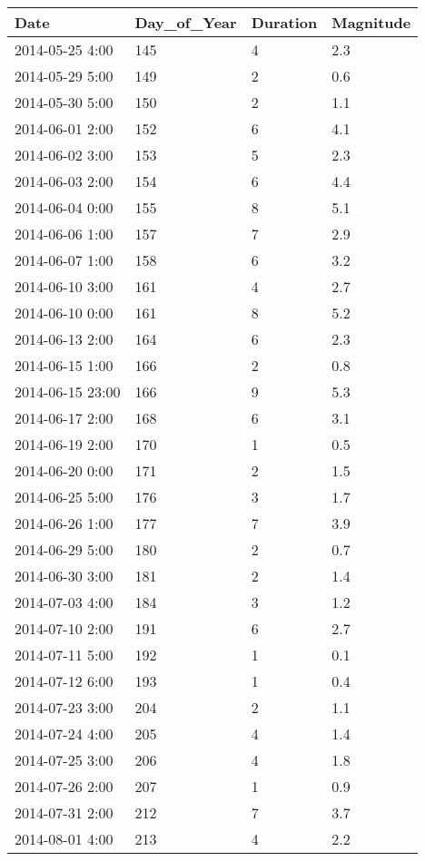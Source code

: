 \documentclass[
]{article}
\begin{document}
\begin{tabular}{l|l|l|l}
\hline
Date & Day\_of\_Year & Duration & Magnitude\\
\hline
2014-05-25 4:00 & 145 & 4 & 2.3\\
\hline
2014-05-29 5:00 & 149 & 2 & 0.6\\
\hline
2014-05-30 5:00 & 150 & 2 & 1.1\\
\hline
2014-06-01 2:00 & 152 & 6 & 4.1\\
\hline
2014-06-02 3:00 & 153 & 5 & 2.3\\
\hline
2014-06-03 2:00 & 154 & 6 & 4.4\\
\hline
2014-06-04 0:00 & 155 & 8 & 5.1\\
\hline
2014-06-06 1:00 & 157 & 7 & 2.9\\
\hline
2014-06-07 1:00 & 158 & 6 & 3.2\\
\hline
2014-06-10 3:00 & 161 & 4 & 2.7\\
\hline
2014-06-10 0:00 & 161 & 8 & 5.2\\
\hline
2014-06-13 2:00 & 164 & 6 & 2.3\\
\hline
2014-06-15 1:00 & 166 & 2 & 0.8\\
\hline
2014-06-15 23:00 & 166 & 9 & 5.3\\
\hline
2014-06-17 2:00 & 168 & 6 & 3.1\\
\hline
2014-06-19 2:00 & 170 & 1 & 0.5\\
\hline
2014-06-20 0:00 & 171 & 2 & 1.5\\
\hline
2014-06-25 5:00 & 176 & 3 & 1.7\\
\hline
2014-06-26 1:00 & 177 & 7 & 3.9\\
\hline
2014-06-29 5:00 & 180 & 2 & 0.7\\
\hline
2014-06-30 3:00 & 181 & 2 & 1.4\\
\hline
2014-07-03 4:00 & 184 & 3 & 1.2\\
\hline
2014-07-10 2:00 & 191 & 6 & 2.7\\
\hline
2014-07-11 5:00 & 192 & 1 & 0.1\\
\hline
2014-07-12 6:00 & 193 & 1 & 0.4\\
\hline
2014-07-23 3:00 & 204 & 2 & 1.1\\
\hline
2014-07-24 4:00 & 205 & 4 & 1.4\\
\hline
2014-07-25 3:00 & 206 & 4 & 1.8\\
\hline
2014-07-26 2:00 & 207 & 1 & 0.9\\
\hline
2014-07-31 2:00 & 212 & 7 & 3.7\\
\hline
2014-08-01 4:00 & 213 & 4 & 2.2\\

\end{tabular}
\end{document}
